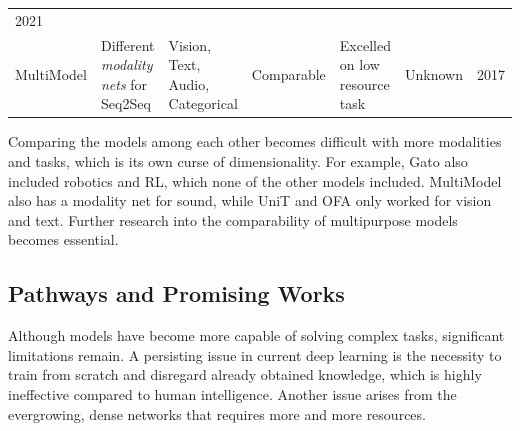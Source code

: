 \documentclass[
]{krantz}
\begin{document}
\begin{longtable}[]{@{}lllllll@{}}
\begin{minipage}[t]{0.12\columnwidth}
2021\strut
\end{minipage}\tabularnewline
\begin{minipage}[t]{0.12\columnwidth}\raggedright
MultiModel\strut
\end{minipage} & \begin{minipage}[t]{0.12\columnwidth}\raggedright
Different \emph{modality nets} for Seq2Seq\strut
\end{minipage} & \begin{minipage}[t]{0.12\columnwidth}\raggedright
Vision, Text, Audio, Categorical\strut
\end{minipage} & \begin{minipage}[t]{0.12\columnwidth}\raggedright
Comparable\strut
\end{minipage} & \begin{minipage}[t]{0.12\columnwidth}\raggedright
Excelled on low resource task\strut
\end{minipage} & \begin{minipage}[t]{0.12\columnwidth}\raggedright
Unknown\strut
\end{minipage} & \begin{minipage}[t]{0.12\columnwidth}\raggedright
2017\strut
\end{minipage}\tabularnewline
\bottomrule
\end{longtable}

Comparing the models among each other becomes difficult with more modalities and tasks, which is its own curse of dimensionality. For example, Gato also included robotics and RL,
which none of the other models included. MultiModel also has a modality net for sound, while UniT and OFA only worked for vision and text. Further research into the comparability of
multipurpose models becomes essential.

\hypertarget{pathways-and-promising-works}{%
\subsection{Pathways and Promising Works}\label{pathways-and-promising-works}}

Although models have become more capable of solving complex tasks, significant limitations remain.
A persisting issue in current deep learning is the necessity to train from scratch and disregard already obtained knowledge, which is highly ineffective compared to human intelligence. Another
issue arises from the evergrowing, dense networks that requires more and more resources.
\end{document}
